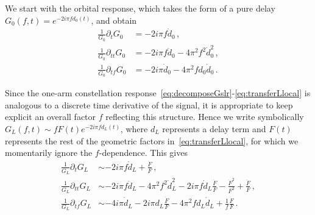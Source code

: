 \documentclass[aps,showpacs,twocolumn,
prd,superscriptaddress,nofootinbib]{revtex4-1}
\begin{document}
We start with the orbital response, which takes the form of a pure delay $G_{0}(f, t) = e^{-2 i \pi f d_{0}(t)}$, and obtain
\begin{subequations}
\begin{align}
	\frac{1}{G_{0}} \partial_{t} G_{0} &= -2i\pi f \dot{d}_{0}\,,\\
	\frac{1}{G_{0}} \partial_{tt} G_{0} &= -2i\pi f \ddot{d}_{0} - 4\pi^{2} f^{2} \dot{d}_{0}^{2} \,,\\
	\frac{1}{G_{0}} \partial_{tf} G_{0} &= -2 i \pi \dot{d}_{0} - 4\pi^{2} f d_{0} \dot{d}_{0} \,.
\end{align}
\end{subequations}

Since the one-arm constellation response~\eqref{eq:decomposeGslr}-\eqref{eq:transferLlocal} is analogous to a discrete time derivative of the signal, it is appropriate to keep explicit an overall factor $f$ reflecting this structure. Hence we write symbolically $G_{L}(f,t) \sim f F(t) e^{-2i \pi f d_{L}(t)}$, where $d_{L}$ represents a delay term and $F(t)$ represents the rest of the geometric factors in~\eqref{eq:transferLlocal}, for which we momentarily ignore the $f$-dependence. This gives
\begin{subequations}
\begin{align}
	\frac{1}{G_{L}} \partial_{t} G_{L} &\sim -2i\pi f \dot{d}_{L} + \frac{\dot{F}}{F}\,,\\
	\frac{1}{G_{L}} \partial_{tt} G_{L} &\sim -2i\pi f \ddot{d}_{L} - 4\pi^{2} f^{2} \dot{d}_{L}^{2} - 2i\pi f \dot{d}_{L} \frac{\dot{F}}{F} - \frac{\dot{F}^{2}}{F^{2}} + \frac{\ddot{F}}{F} \,,\\
	\frac{1}{G_{L}} \partial_{tf} G_{L} &\sim -4 i \pi \dot{d}_{L} - 2i\pi d_{L} \frac{\dot{F}}{F} - 4\pi^{2} f d_{L} \dot{d}_{L} + \frac{1}{f}\frac{\dot{F}}{F}\,.
\end{align}
\end{subequations}
\end{document}
